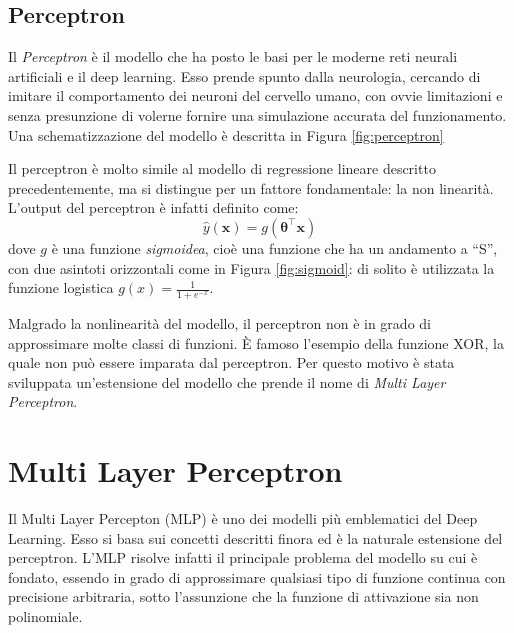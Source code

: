 \documentclass{standalone}
\begin{document}
\subsection{Perceptron}
Il \emph{Perceptron} è il modello che ha posto le basi per le moderne reti
neurali artificiali e il deep learning. Esso prende spunto dalla neurologia,
cercando di imitare il comportamento dei neuroni del cervello umano, con ovvie
limitazioni e senza presunzione di volerne fornire una simulazione accurata del
funzionamento. Una schematizzazione del modello è descritta in Figura
\ref{fig:perceptron}


Il perceptron è molto simile al modello di regressione lineare descritto
precedentemente, ma si distingue per un fattore fondamentale: la non linearità.
L'output del perceptron è infatti definito come:
$$\hat{y}(\bm x) = g(\bm \theta^\intercal \bm x)$$
dove $g$ è una funzione \emph{sigmoidea}, cioè una funzione che ha un andamento
a ``S'', con due asintoti orizzontali come in Figura \ref{fig:sigmoid}: di
solito è utilizzata la funzione logistica $\displaystyle g(x) = \frac{1}{1 + e^{-x}}$.


Malgrado la nonlinearità del modello, il perceptron non è in grado di
approssimare molte classi di funzioni. È famoso l'esempio della funzione XOR,
la quale non può essere imparata dal perceptron. Per questo motivo è stata
sviluppata un'estensione del modello che prende il nome di \emph{Multi Layer
  Perceptron}.
\section{Multi Layer Perceptron}
Il Multi Layer Percepton (MLP) è uno dei modelli più emblematici del Deep
Learning. Esso si basa sui concetti descritti finora ed è la naturale
estensione del perceptron. L'MLP risolve infatti il principale problema del
modello su cui è fondato, essendo in grado di approssimare qualsiasi tipo di
funzione continua con precisione arbitraria, sotto l'assunzione che la
funzione di attivazione sia non polinomiale\cite{universal-approximator}.
\end{document}
